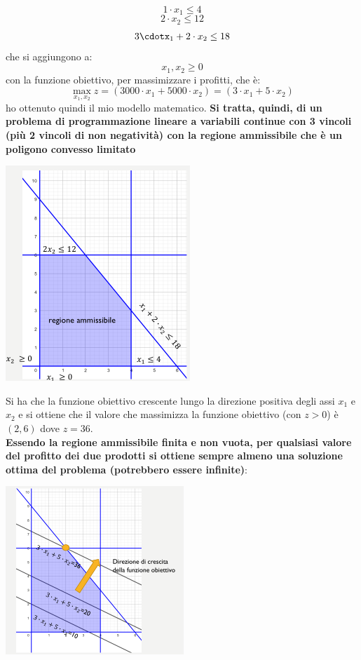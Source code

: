 \documentclass[a4paper,12pt, oneside]{book}
\begin{document}
\begin{esempio}
  \[1\cdot x_1\leq 4\]
  \[2\cdot x_2\leq 12\]
  \[3\cdotx_1+2\cdot x_2\leq 18\]
  che si aggiungono a:
  \[x_1,x_2\geq 0\]
  con la funzione obiettivo, per massimizzare i profitti, che è:
  \[\max_{x_1,x_2} z = (3000\cdot x_1+5000\cdot x_2) = (3\cdot
    x_1+5\cdot x_2)\]
  ho ottenuto quindi il mio modello matematico. \textbf{Si tratta,
    quindi, di un problema di programmazione lineare a variabili
    continue con 3 vincoli (più 2 vincoli di non negatività) con la
    regione ammissibile che è un poligono convesso limitato}
  \begin{center}
    \includegraphics[scale = 0.7]{img/3d7.png}
  \end{center}
  Si ha che la funzione obiettivo crescente lungo la
  direzione positiva degli assi $x_1$ e $x_2$ e si ottiene che il valore
  che massimizza la funzione obiettivo (con $z>0$) è $(2,6)$ dove $z =
  36$.\\
  \textbf{Essendo la regione ammissibile finita e non vuota, per
    qualsiasi valore del profitto dei due prodotti si ottiene sempre
    almeno una soluzione ottima del problema (potrebbero essere
    infinite)}:
  \begin{center}
    \includegraphics[scale = 0.8]{img/3d8.png}
  \end{center}
\end{esempio}
\end{document}

